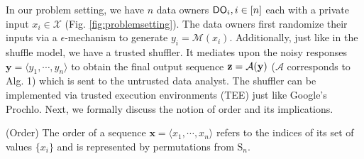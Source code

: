 In our problem setting, we have $n$ data owners $\textsf{DO}_i, i \in [n]$ each with a private input $x_i \in \mathcal{X}$ (Fig. \ref{fig:problemsetting}).  
 The data owners first randomize their inputs via a $\epsilon$-\ldp mechanism to generate $y_i=\mathcal{M}(x_i)$. 
 Additionally, just like in the shuffle model, we have a trusted shuffler. It mediates upon the noisy responses $\mathbf{y}=\langle y_1,\cdots,y_n \rangle$ 
 to obtain the final output sequence $\bf{z}=\mathcal{A}(\bf{y})$ ($\mathcal{A}$ corresponds to Alg. 1) 
 which is sent to the untrusted data analyst. The shuffler can be implemented via trusted execution environments (TEE) just like Google's Prochlo. 
 Next, we formally discuss the notion of order and its implications. 
\begin{defn}(Order) The order of a sequence $\mathbf{x}=\langle x_1,\cdots, x_n\rangle$ refers to the indices of its set of values $\{x_i\}$ and is represented by permutations from $\mathrm{S}_n$.\vspace{-0.2cm}\end{defn} 

